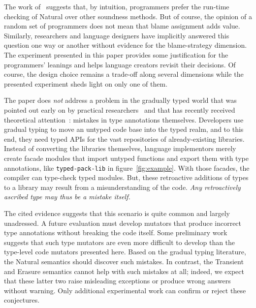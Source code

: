 
The work of~\citet{tgpk-dls-2018} suggests that, by intuition, programmers
prefer the run-time checking of Natural over other soundness methods. But of course,
the opinion of a random set of programmers does not mean that blame
assignment adds value. Similarly, researchers and language designers have
implicitly answered this question one way or another without evidence for the
blame-strategy dimension. The experiment presented in this paper provides some
justification for the programmers' leanings
and helps language creators revisit
their decisions. Of course, the design choice remains a trade-off
along several dimensions while the presented experiment sheds light on
only one of them. 

The paper does {\em not\/} address a problem in the gradually typed world that
was pointed out early on by practical researchers~\citep{incorrect-ts,
sta-nt-base-types, wmwz-ecoop-2017} and that has recently received theoretical
attention~\citep{gfd-oopsla-2019, cc-oopsla-20}: mistakes in type annotations
themselves.  Developers use gradual typing to move an untyped code base into the
typed realm, and to this end, they need typed APIs for the vast repositories of
already-existing libraries. Instead of converting the libraries themselves,
language implementors merely create facade modules that import untyped functions
and export them with type annotations, like {\tt typed-pack-lib} in
figure~\ref{fig:example}.  With those facades, the compiler can 
type-check typed modules. But, these retroactive additions of types to a library
may result from a misunderstanding of the code. \emph{Any retroactively ascribed
type may thus be a mistake itself.}

The cited evidence suggests that this scenario is quite common and largely
unadressed.  A future evaluation must develop mutators that produce incorrect
type annotations without breaking the code itself. Some preliminary work
suggests that such type mutators are even more difficult to develop than the
type-level code mutators presented here. Based on the gradual typing literature,
the Natural semantics should discover such mistakes. In contrast, the Transient
and Erasure semantics cannot help with such mistakes at all; indeed, we expect
that these latter two raise misleading exceptions or produce wrong answers
without warning.  Only additional experimental work can confirm or reject these
conjectures.



